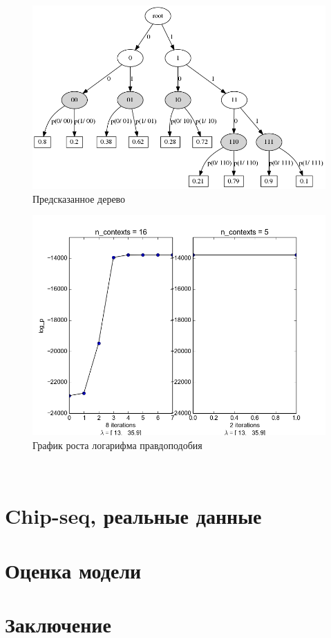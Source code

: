\documentclass{matmex-diploma-custom}
\begin{document}
\begin{itemize}
\begin{enumerate}
\begin{figure}[ht]
{	}
\hfil \hfil%
\begin{minipage}[b]{0.49 \textwidth}
	\includegraphics[scale=0.3]{img/sample/trie_.png}
	\centering
	\caption{ Предсказанное дерево }
	\label{ris:sample_predicted_trie}
\end{minipage}
\end{figure}
\begin{figure}[hbtp]
	\includegraphics[scale=0.4]{img/sample/plot_.png}
	\centering
	\caption{ График роста логарифма правдоподобия }
\label{ris:sample_log_likelihood}
\end{figure}
\\
\end{enumerate}
\end{itemize}


\section{Chip-seq, реальные данные}


\section{Оценка модели}

\section*{Заключение}



\end{document}
